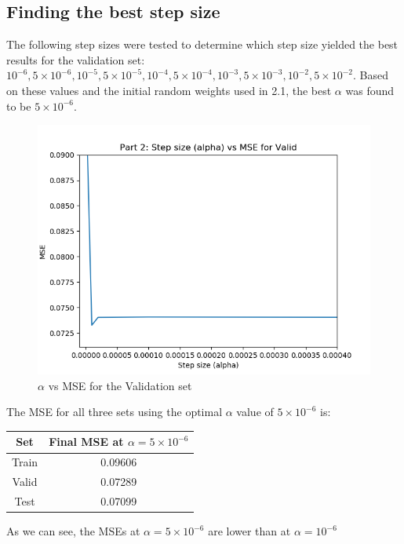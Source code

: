 \documentclass[paper=a4, fontsize=11pt]{scrartcl} %
\numberwithin{equation}{section} %
\numberwithin{figure}{section} %
\numberwithin{table}{section} %
\begin{document}
\subsection{Finding the best step size}
The following step sizes were tested to determine which step size yielded the best results for the validation set:  \(10^{-6}, 5\times10^{-6}, 10^{-5}, 5\times10^{-5}, 10^{-4}, 5\times10^{-4}, 10^{-3}, 5\times10^{-3}, 10^{-2}, 5\times10^{-2}\). Based on these values and the initial random weights used in 2.1, the best \(\alpha\) was found to be \(5\times10^{-6}\). 

\begin{figure}[H]
    \includegraphics[width=\linewidth]{q2p2.png}
    \caption{\(\alpha\) vs MSE for the Validation set}
    \label{fig:q2p2}
\end{figure}

The MSE for all three sets using the optimal \(\alpha\) value of \(5\times10^{-6}\) is:
\begin{center}
\begin{tabular}{ |c|c| } 
    \hline
    \textbf{Set} & \textbf{Final MSE at \(\alpha = 5\times10^{-6}\)} \\
    \hline
    Train &  0.09606 \\
    Valid & 0.07289 \\ 
    Test & 0.07099 \\
    \hline
\end{tabular}
\end{center}
As we can see, the MSEs at \(\alpha = 5\times10^{-6}\) are lower than at  \(\alpha = 10^{-6}\) 
\end{document}
